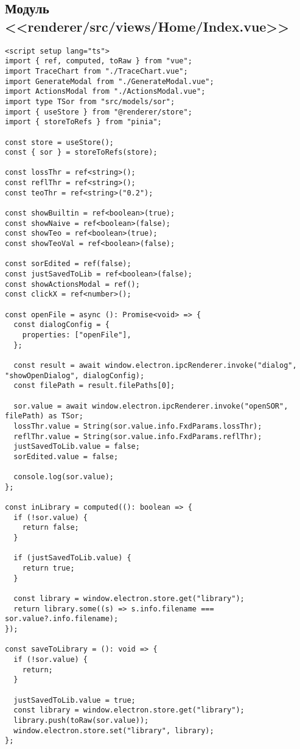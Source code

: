 \subsection{Модуль <<renderer/src/views/Home/Index.vue>>}
\begin{lstlisting}[language=vue]
<script setup lang="ts">
import { ref, computed, toRaw } from "vue";
import TraceChart from "./TraceChart.vue";
import GenerateModal from "./GenerateModal.vue";
import ActionsModal from "./ActionsModal.vue";
import type TSor from "src/models/sor";
import { useStore } from "@renderer/store";
import { storeToRefs } from "pinia";

const store = useStore();
const { sor } = storeToRefs(store);

const lossThr = ref<string>();
const reflThr = ref<string>();
const teoThr = ref<string>("0.2");

const showBuiltin = ref<boolean>(true);
const showNaive = ref<boolean>(false);
const showTeo = ref<boolean>(true);
const showTeoVal = ref<boolean>(false);

const sorEdited = ref(false);
const justSavedToLib = ref<boolean>(false);
const showActionsModal = ref();
const clickX = ref<number>();

const openFile = async (): Promise<void> => {
  const dialogConfig = {
    properties: ["openFile"],
  };

  const result = await window.electron.ipcRenderer.invoke("dialog", "showOpenDialog", dialogConfig);
  const filePath = result.filePaths[0];

  sor.value = await window.electron.ipcRenderer.invoke("openSOR", filePath) as TSor;
  lossThr.value = String(sor.value.info.FxdParams.lossThr);
  reflThr.value = String(sor.value.info.FxdParams.reflThr);
  justSavedToLib.value = false;
  sorEdited.value = false;

  console.log(sor.value);
};

const inLibrary = computed((): boolean => {
  if (!sor.value) {
    return false;
  }

  if (justSavedToLib.value) {
    return true;
  }

  const library = window.electron.store.get("library");
  return library.some((s) => s.info.filename === sor.value?.info.filename);
});

const saveToLibrary = (): void => {
  if (!sor.value) {
    return;
  }

  justSavedToLib.value = true;
  const library = window.electron.store.get("library");
  library.push(toRaw(sor.value));
  window.electron.store.set("library", library);
};


\end{lstlisting}
